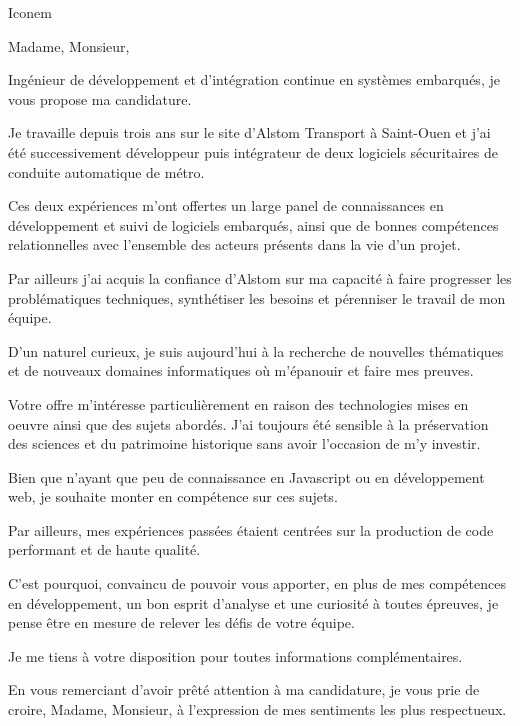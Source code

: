 \documentclass[12pt]{lettre}
\makeatletter
\newcommand*{\NoRule}{\renewcommand*{\rule@length}{0}}
\makeatother
\begin{document}
\begin{letter}{Iconem}

  \def\concname{Objet :~}


  \signature{Hoel IRIS}
  \address{Hoel IRIS\\
  54 avenue Mathurin Moreau\\
  75019 Paris\\
  Tel : 06 18 39 30 11\\
  E-Mail : hoel.iris@gmail.com}
  \NoRule
  \notelephone
  \nofax
    \opening{Madame, Monsieur,}
    
    Ingénieur de développement et d'intégration continue en systèmes embarqués, je vous propose ma candidature.

    Je travaille depuis trois ans sur le site d'Alstom Transport à Saint-Ouen et j'ai été successivement développeur puis intégrateur de deux logiciels sécuritaires de conduite automatique de métro.

    Ces deux expériences m'ont offertes un large panel de connaissances en développement et suivi de logiciels embarqués, ainsi que de bonnes compétences relationnelles avec l'ensemble des acteurs présents dans la vie d'un projet. 

    Par ailleurs j'ai acquis la confiance d'Alstom sur ma capacité à faire progresser les problématiques techniques, synthétiser les besoins et pérenniser le travail de mon équipe.

    D'un naturel curieux, je suis aujourd'hui à la recherche de nouvelles thématiques et de nouveaux domaines informatiques où m'épanouir et faire mes preuves.
    
    Votre offre m'intéresse particulièrement en raison des technologies mises en oeuvre ainsi que des sujets abordés. J'ai toujours été sensible à la préservation des sciences et du patrimoine historique sans avoir l'occasion de m'y investir.
    
    Bien que n'ayant que peu de connaissance en Javascript ou en développement web, je souhaite monter en compétence sur ces sujets.
    
    Par ailleurs, mes expériences passées étaient centrées sur la production de code performant et de haute qualité. 
    
    C'est pourquoi, convaincu de pouvoir vous apporter, en plus de mes compétences en développement, un bon esprit d'analyse et une curiosité à toutes épreuves, je pense être en mesure de relever les défis de votre équipe.

    Je me tiens à votre disposition pour toutes informations complémentaires.
 
   
    \closing{En vous remerciant d’avoir prêté attention à ma candidature, je vous prie de croire, Madame, Monsieur, à l’expression de mes sentiments les plus respectueux.}
    
 
\end{letter}
 
\end{document}
